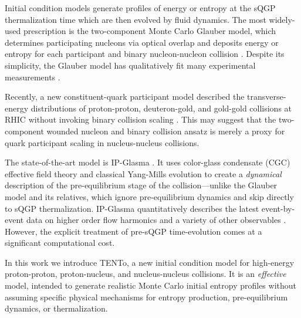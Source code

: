 \documentclass[aps,prc,reprint,amsmath,nofootinbib]{revtex4-1}
\newcommand{\trento}{T\raisebox{-.5ex}{R}ENTo}
\begin{document}
Initial condition models generate profiles of energy or entropy at the sQGP thermalization time which are then evolved by fluid dynamics.
The most widely-used prescription is the two-component Monte Carlo Glauber model, which determines participating nucleons via optical overlap and deposits energy or entropy for each participant and binary nucleon-nucleon collision \cite{Miller:2007ri}.
Despite its simplicity, the Glauber model has qualitatively fit many experimental measurements \cite{}.

Recently, a new constituent-quark participant model described the transverse-energy distributions of proton-proton, deuteron-gold, and gold-gold collisions at RHIC without invoking binary collision scaling \cite{PhysRevC.89.044905}.
This may suggest that the two-component wounded nucleon and binary collision ansatz is merely a proxy for quark participant scaling in nucleus-nucleus collisions.

The state-of-the-art model is IP-Glasma \cite{Schenke:2012wb}.
It uses color-glass condensate (CGC) effective field theory \cite{McLerran:1993ni,McLerran:1993ka,Gelis:2010nm} and classical Yang-Mills evolution to create a \emph{dynamical} description of the pre-equilibrium stage of the collision---unlike the Glauber model and its relatives, which ignore pre-equilibrium dynamics and skip directly to sQGP thermalization.
IP-Glasma quantitatively describes the latest event-by-event data on higher order flow harmonics and a variety of other observables \cite{Schenke:2014zha}.
However, the explicit treatment of pre-sQGP time-evolution comes at a significant computational cost.

In this work we introduce \trento, a new initial condition model for high-energy proton-proton, proton-nucleus, and nucleus-nucleus collisions.
It is an \emph{effective} model, intended to generate realistic Monte Carlo initial entropy profiles without assuming specific physical mechanisms for entropy production, pre-equilibrium dynamics, or thermalization.

\end{document}
